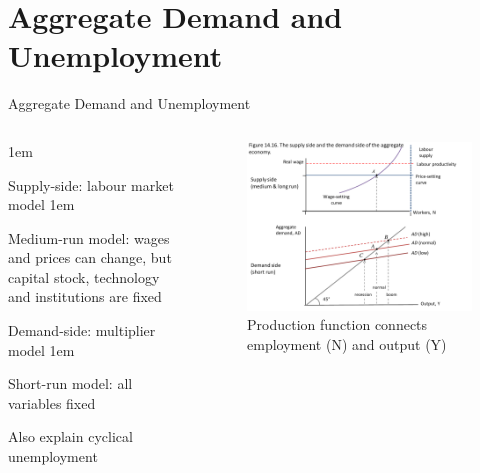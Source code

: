 \documentclass[11pt,aspectratio=43,usenames,dvipsnames]{beamer}
\let\olditemize=\itemize
\let\endolditemize=\enditemize
\renewenvironment{itemize}{\olditemize \itemsep1em}{\endolditemize}
\theoremstyle{definition}
\begin{document}
\section[AD \& UE]{Aggregate Demand and Unemployment}
\label{sec:Aggregate_Demand_and_Unemployment}

\begin{frame}{Aggregate Demand and Unemployment}
\label{slide:Aggregate_Demand_and_Unemployment}
    \begin{columns}
        \begin{column}{0.4\textwidth}
            \begin{itemize}
                \item \alert{Supply-side}: labour market model
                \begin{itemize}
                    \item \alert{Medium-run model}: wages and prices can change, but capital stock, technology and institutions are fixed
                \end{itemize}
                \item \alert{Demand-side}: multiplier model
                \begin{itemize}
                    \item \alert{Short-run model}: all variables fixed
                \end{itemize}
                \item Also explain \alert{cyclical unemployment}

            \end{itemize}

        \end{column}
        \begin{column}{0.6\textwidth}
            \begin{figure}
                \centering
                \includegraphics[width=\textwidth]{./figures/19.pdf}
                \caption{Production function connects employment (N) and output (Y)}
            \end{figure}

        \end{column}
    \end{columns}

\end{frame}
\end{document}
